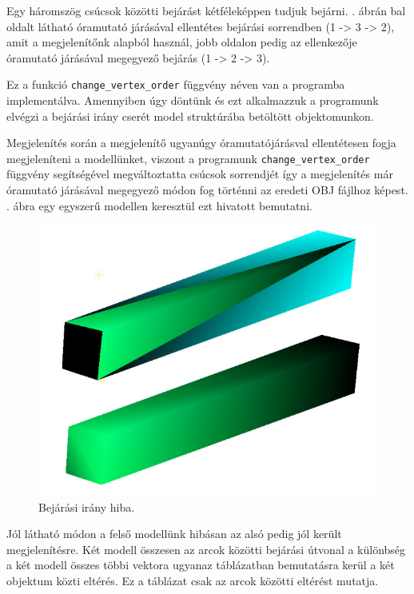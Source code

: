 Egy háromszög csúcsok közötti bejárást kétféleképpen tudjuk bejárni. . ábrán bal oldalt látható  óramutató járásával ellentétes bejárási sorrendben (1 -> 3 -> 2), amit a megjelenítőnk alapból használ, jobb oldalon pedig az ellenkezője óramutató járásával megegyező bejárás (1 -> 2 -> 3).

Ez a funkció \texttt{change\_vertex\_order} függvény néven van a programba implementálva. Amennyiben úgy döntünk és ezt alkalmazzuk a programunk elvégzi a bejárási irány cserét model struktúrába betöltött objektomunkon.

Megjelenítés során a megjelenítő ugyanúgy óramutatójárásval ellentétesen fogja megjeleníteni a modellünket, viszont a programunk \texttt{change\_vertex\_order} függvény segítségével megváltoztatta csúcsok sorrendjét így a megjelenítés már óramutató járásával megegyező módon fog történni az eredeti OBJ fájlhoz képest.\\
\newpage
{}. ábra egy egyszerű modellen keresztül ezt hivatott bemutatni.
\bigskip
\begin{figure}[h]
\centering
\includegraphics[scale=0.5]{images/order.png}
\caption{Bejárási irány hiba.}
\label{fig:bej2}
\end{figure}
\bigskip

Jól látható módon a felső modellünk hibásan az alsó pedig jól került megjelenítésre. Két modell összesen az arcok közötti bejárási útvonal a különbség a két modell összes többi vektora ugyanaz  táblázatban bemutatásra kerül a két objektum közti eltérés. Ez a táblázat csak az arcok közötti eltérést mutatja.

